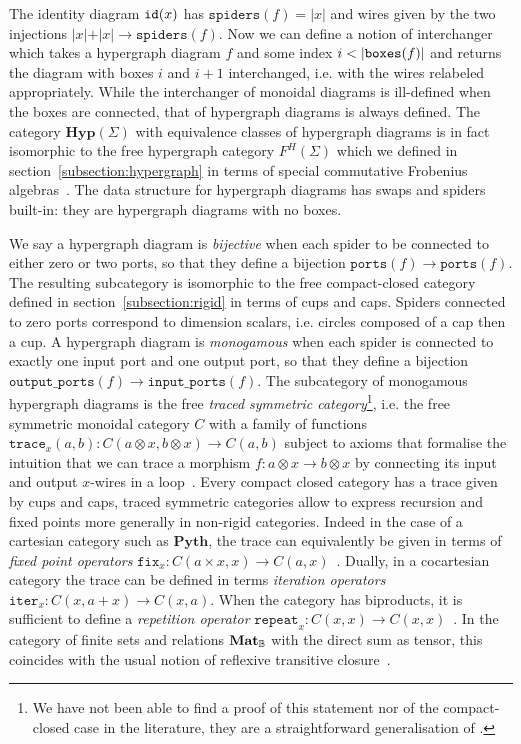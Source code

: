 The identity diagram $\mathtt{id}(x)$ has $\mathtt{spiders}(f) = \vert x \vert$ and wires given by the two injections $\vert x \vert + \vert x \vert \to \mathtt{spiders}(f)$.
Now we can define a notion of interchanger which takes a hypergraph diagram $f$ and some index $i < \vert \mathtt{boxes}(f) \vert$ and returns the diagram with boxes $i$ and $i + 1$ interchanged, i.e. with the wires relabeled appropriately.
While the interchanger of monoidal diagrams is ill-defined when the boxes are connected, that of hypergraph diagrams is always defined.
The category $\mathbf{Hyp}(\Sigma)$ with equivalence classes of hypergraph diagrams is in fact isomorphic to the free hypergraph category $F^H(\Sigma)$ which we defined in section~\ref{subsection:hypergraph} in terms of special commutative Frobenius algebras~\cite[Theorem 3.3]{BonchiEtAl16}.
The data structure for hypergraph diagrams has swaps and spiders built-in: they are hypergraph diagrams with no boxes.

We say a hypergraph diagram is \emph{bijective} when each spider to be connected to either zero or two ports, so that they define a bijection $\mathtt{ports}(f) \to \mathtt{ports}(f)$.
The resulting subcategory is isomorphic to the free compact-closed category defined in section~\ref{subsection:rigid} in terms of cups and caps.
Spiders connected to zero ports correspond to dimension scalars, i.e. circles composed of a cap then a cup.
A hypergraph diagram is \emph{monogamous} when each spider is connected to exactly one input port and one output port, so that they define a bijection $\mathtt{output\_ports}(f) \to \mathtt{input\_ports}(f)$.
The subcategory of monogamous hypergraph diagrams is the free \emph{traced symmetric category}\footnote
{We have not been able to find a proof of this statement nor of the compact-closed case in the literature, they are a straightforward generalisation of \cite[Theorem 3.3]{BonchiEtAl16}.}, i.e. the free symmetric monoidal category $C$ with a family of functions $\mathtt{trace}_x(a, b) : C(a \otimes x, b \otimes x) \to C(a, b)$ subject to axioms that formalise the intuition that we can trace a morphism $f : a \otimes x \to b \otimes x$ by connecting its input and output $x$-wires in a loop~\cite{JoyalEtAl96}.
Every compact closed category has a trace given by cups and caps, traced symmetric categories allow to express recursion and fixed points more generally in non-rigid categories.
Indeed in the case of a cartesian category such as $\mathbf{Pyth}$, the trace can equivalently be given in terms of \emph{fixed point operators} $\mathtt{fix}_x : C(a \times x, x) \to C(a, x)$~\cite[Proposition~6.8]{Selinger10}.
Dually, in a cocartesian category the trace can be defined in terms \emph{iteration operators} $\mathtt{iter}_x : C(x, a + x) \to C(x, a)$.
When the category has biproducts, it is sufficient to define a \emph{repetition operator} $\mathtt{repeat}_x : C(x, x) \to C(x, x)$~\cite[Proposition~6.11]{Selinger10}.
In the category of finite sets and relations $\mathbf{Mat}_{\mathbb{B}}$ with the direct sum as tensor, this coincides with the usual notion of reflexive transitive closure~\cite[Proposition~6.3]{JoyalEtAl96}.

